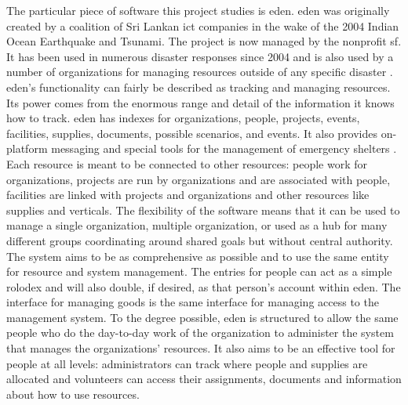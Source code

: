 \documentclass[a4paper,man,natbib,floatsintext]{apa6}
\begin{document}
   The particular piece of software this project studies is \acrlong{eden}. \acrshort{eden} was originally created by a coalition of Sri Lankan \acrlong{ict} companies in the wake of the 2004 Indian Ocean Earthquake and Tsunami. The project is now managed by the nonprofit \gls{sf}. It has been used in numerous disaster responses since 2004 and is also used by a number of organizations for managing resources outside of any specific disaster \citep{Sahana_Foundation_undated-hl}. \acrshort{eden}'s functionality can fairly be described as tracking and managing resources. Its power comes from the enormous range and detail of the information it knows how to track. \acrshort{eden} has indexes for organizations, people, projects, events, facilities, supplies, documents, possible scenarios, and events. It also provides on-platform messaging and special tools for the management of emergency shelters \citep{Sahana_Foundation2011-od}. Each resource is meant to be connected to other resources: people work for organizations, projects are run by organizations and are associated with people, facilities are linked with projects and organizations and other resources like supplies and verticals. The flexibility of the software means that it can be used to manage a single organization, multiple organization, or used as a hub for many different groups coordinating around shared goals but without central authority. The system aims to be as comprehensive as possible and to use the same entity for resource and system management. The entries for people can act as a simple rolodex and will also double, if desired, as that person's account within \acrshort{eden}. The interface for managing goods is the same interface for managing access to the management system. To the degree possible, \acrshort{eden} is structured to allow the same people who do the day-to-day work of the organization to administer the system that manages the organizations' resources. It also aims to be an effective tool for people at all levels: administrators can track where people and supplies are allocated and volunteers can access their assignments, documents and information about how to use resources.
   
\end{document}
